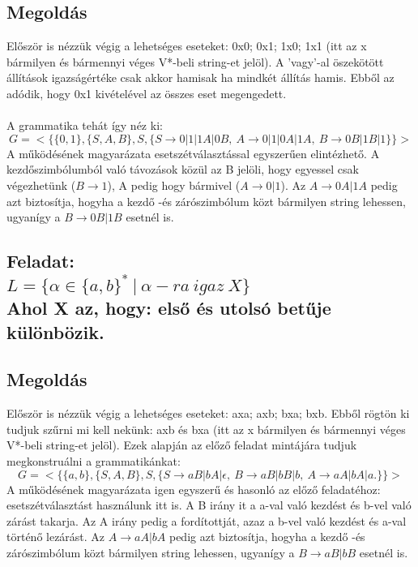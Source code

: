 \documentclass[12pt]{article}
\begin{document}
\subsection{Megoldás}
Először is nézzük végig a lehetséges eseteket: 0x0; 0x1; 1x0; 1x1
(itt az x bármilyen és bármennyi véges V*-beli string-et jelöl).
A 'vagy'-al öszekötött állítások igazságértéke csak akkor hamisak ha mindkét állítás hamis.
Ebből az adódik, hogy 0x1 kivételével az összes eset megengedett. \\\\
A grammatika tehát így néz ki: \\
$$ G=<\{ \{0,1\}, \{S,A,B \}, S, \{ S \rightarrow 0|1|1A|0B, \ A \rightarrow 0|1|0A|1A, \ B 
\rightarrow 0B|1B|1 \} \}> $$
A működésének magyarázata esetszétválasztással egyszerűen elintézhető. A kezdőszimbólumból való távozások
közül az B jelöli, hogy egyessel csak végezhetünk ($ B \rightarrow 1 $), 
A pedig hogy bármivel ($ A \rightarrow 0|1 $).
Az $ A \rightarrow 0A|1A $ pedig azt biztosítja, hogyha a kezdő -és zárószimbólum közt bármilyen 
string lehessen, ugyanígy a $ B \rightarrow 0B|1B $
esetnél is.

\subsection{Feladat: \\
$ L=\{ \alpha \in \{ a,b \}^* \ | \ \alpha-ra \ igaz \ X \} $ \\
Ahol X az, hogy: első és utolsó betűje különbözik.}
\maketitle
\subsection{Megoldás}
Először is nézzük végig a lehetséges eseteket: axa; axb; bxa; bxb. Ebből rögtön ki tudjuk szűrni mi kell nekünk:
axb és bxa (itt az x bármilyen és bármennyi véges V*-beli string-et jelöl).
Ezek alapján az előző feladat mintájára tudjuk megkonstruálni a grammatikánkat:
$$ G=<\{ \{a,b\}, \{S,A,B \}, S,
\{ S \rightarrow aB|bA|\epsilon, \ B \rightarrow aB|bB|b, \ A \rightarrow aA|bA|a. \} \}> $$
A működésének magyarázata igen egyszerű és hasonló az előző feladatéhoz:
esetszétválasztást használunk itt is. A B irány it a a-val való kezdést és b-vel való zárást takarja.
Az A irány pedig a fordítottját, azaz a b-vel való kezdést és a-val történő lezárást.
Az $ A \rightarrow aA|bA $ pedig azt biztosítja, hogyha a kezdő -és zárószimbólum közt bármilyen 
string lehessen, ugyanígy a $ B \rightarrow aB|bB $ esetnél is.
\end{document}
